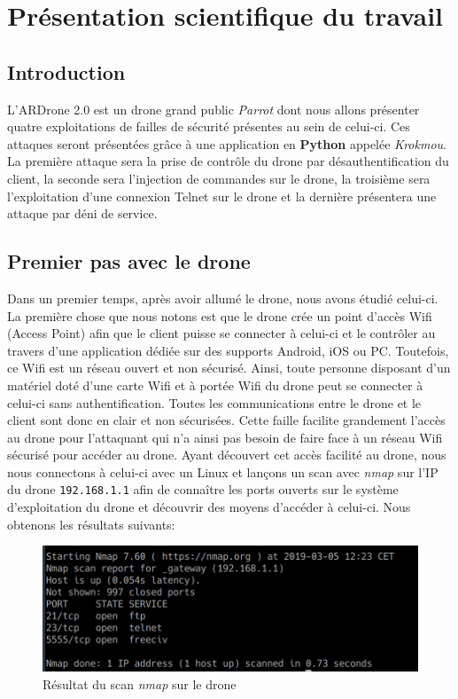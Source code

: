 \section{Présentation scientifique du travail}
\subsection{Introduction}
L'ARDrone 2.0 est un drone grand public \textit{Parrot} dont nous allons présenter quatre exploitations de failles de sécurité présentes au sein de celui-ci. Ces attaques seront présentées grâce à une application en \textbf{Python} appelée \textit{Krokmou}. La première attaque sera la prise de contrôle du drone par désauthentification du client, la seconde sera l'injection de commandes sur le drone, la troisième sera l'exploitation d'une connexion Telnet sur le drone et la dernière présentera une attaque par déni de service.

\subsection{Premier pas avec le drone}
Dans un premier temps, après avoir allumé le drone, nous avons étudié celui-ci. La première chose que nous notons est que le drone crée un point d'accès Wifi (Access Point) afin que le client puisse se connecter à celui-ci et le contrôler au travers d'une application dédiée sur des supports Android, iOS ou PC. Toutefois, ce Wifi est un réseau ouvert et non sécurisé. Ainsi, toute personne disposant d'un matériel doté d'une carte Wifi et à portée Wifi du drone peut se connecter à celui-ci sans authentification. Toutes les communications entre le drone et le client sont donc en clair et non sécurisées. Cette faille facilite grandement l'accès au drone pour l'attaquant qui n'a ainsi pas besoin de faire face à un réseau Wifi sécurisé pour accéder au drone. Ayant découvert cet accès facilité au drone, nous nous connectons à celui-ci avec un Linux et lançons un scan avec \textit{nmap} sur l'IP du drone \verb!192.168.1.1! afin de connaître les ports ouverts sur le système d'exploitation du drone et découvrir des moyens d'accéder à celui-ci. Nous obtenons les résultats suivants:

\begin{figure}[H]
  \centering
  \includegraphics[scale=0.5]{images/nmap.png}
  \caption{Résultat du scan \textit{nmap} sur le drone}
\end{figure}


